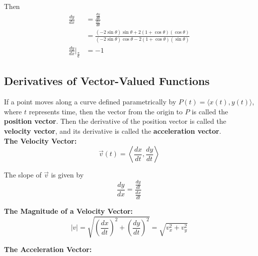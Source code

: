         \noindent Then \\

        \begin{align*}
            \frac{dy}{dx} &= \frac{\frac{dy}{d\theta}}{\frac{dx}{d\theta}} \\
            &= \frac{(-2\sin\theta)\sin\theta+2(1+\cos\theta)(\cos\theta)}{(-2\sin\theta)\cos\theta-2(1+\cos\theta)(\sin\theta)} \\
            \frac{dy}{dx}\Bigr|_{\frac{\pi}{6}} &= -1
        \end{align*}



    \subsection{Derivatives of Vector-Valued Functions}
        If a point moves along a curve defined parametrically by $P(t)=\langle x(t), y(t)\rangle$,
        where $t$ represents time, then the vector from the origin to $P$ is called the
        \textbf{position vector}. Then the derivative of the position vector is called the
        \textbf{velocity vector}, and its derivative is called the \textbf{acceleration vector}.  \\

        \noindent \color{purple} \textbf{The Velocity Vector:} \color{black} \\

        \begin{equation*}
            \overrightarrow{v}(t) = \left\langle\frac{dx}{dt},\frac{dy}{dt}\right\rangle
        \end{equation*}

        \noindent The slope of $\overrightarrow{v}$ is given by \\

        \begin{equation*}
            \frac{dy}{dx} = \frac{\frac{dy}{dt}}{\frac{dx}{dt}}
        \end{equation*}

        \noindent \color{purple} \textbf{The Magnitude of a Velocity Vector:} \color{black} \\

        \begin{equation*}
            |v| = \sqrt{\left(\frac{dx}{dt}\right)^2+\left(\frac{dy}{dt}\right)^2} = \sqrt{v^2_x+v^2_y}
        \end{equation*}

        \noindent \color{purple} \textbf{The Acceleration Vector:} \color{black} \\

